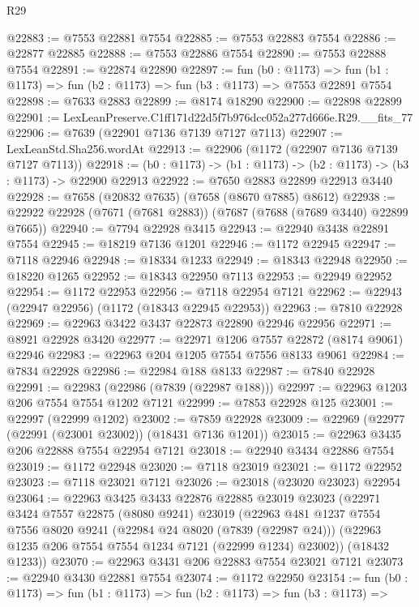 \begin{lexlean}{R29}
\begin{coremodule}
@22883 := @7553 @22881 @7554
@22885 := @7553 @22883 @7554
@22886 := @22877 @22885
@22888 := @7553 @22886 @7554
@22890 := @7553 @22888 @7554
@22891 := @22874 @22890
@22897 := fun (b0 : @1173) =>
  fun (b1 : @1173) => fun (b2 : @1173) => fun (b3 : @1173) => @7553 @22891 @7554
@22898 := @7633 @2883
@22899 := @8174 @18290
@22900 := @22898 @22899
@22901 := LexLeanPreserve.C1ff171d22d5f7b976dcc052a277d666e.R29.__fits_77
@22906 := @7639 (@22901 @7136 @7139 @7127 @7113)
@22907 := LexLeanStd.Sha256.wordAt
@22913 := @22906 (@1172 (@22907 @7136 @7139 @7127 @7113))
@22918 := (b0 : @1173) -> (b1 : @1173) -> (b2 : @1173) -> (b3 : @1173) -> @22900 @22913
@22922 := @7650 @2883 @22899 @22913 @3440
@22928 := @7658 (@20832 @7635) (@7658 (@8670 @7885) @8612)
@22938 := @22922 @22928 (@7671 (@7681 @2883)) (@7687 (@7688 (@7689 @3440) @22899 @7665))
@22940 := @7794 @22928 @3415
@22943 := @22940 @3438 @22891 @7554
@22945 := @18219 @7136 @1201
@22946 := @1172 @22945
@22947 := @7118 @22946
@22948 := @18334 @1233
@22949 := @18343 @22948
@22950 := @18220 @1265
@22952 := @18343 @22950 @7113
@22953 := @22949 @22952
@22954 := @1172 @22953
@22956 := @7118 @22954 @7121
@22962 := @22943 (@22947 @22956) (@1172 (@18343 @22945 @22953))
@22963 := @7810 @22928
@22969 := @22963 @3422 @3437 @22873 @22890 @22946 @22956
@22971 := @8921 @22928 @3420
@22977 := @22971 @1206 @7557 @22872 (@8174 @9061) @22946
@22983 := @22963 @204 @1205 @7554 @7556 @8133 @9061
@22984 := @7834 @22928
@22986 := @22984 @188 @8133
@22987 := @7840 @22928
@22991 := @22983 (@22986 (@7839 (@22987 @188)))
@22997 := @22963 @1203 @206 @7554 @7554 @1202 @7121
@22999 := @7853 @22928 @125
@23001 := @22997 (@22999 @1202)
@23002 := @7859 @22928
@23009 := @22969 (@22977 (@22991 (@23001 @23002)) (@18431 @7136 @1201))
@23015 := @22963 @3435 @206 @22888 @7554 @22954 @7121
@23018 := @22940 @3434 @22886 @7554
@23019 := @1172 @22948
@23020 := @7118 @23019
@23021 := @1172 @22952
@23023 := @7118 @23021 @7121
@23026 := @23018 (@23020 @23023) @22954
@23064 := @22963
    @3425
    @3433
    @22876
    @22885
    @23019
    @23023
    (@22971
      @3424
      @7557
      @22875
      (@8080 @9241)
      @23019
      (@22963
        @481
        @1237
        @7554
        @7556
        @8020
        @9241
        (@22984 @24 @8020 (@7839 (@22987 @24)))
        (@22963 @1235 @206 @7554 @7554 @1234 @7121 (@22999 @1234) @23002))
      (@18432 @1233))
@23070 := @22963 @3431 @206 @22883 @7554 @23021 @7121
@23073 := @22940 @3430 @22881 @7554
@23074 := @1172 @22950
@23154 := fun (b0 : @1173) =>
  fun (b1 : @1173) =>
  fun (b2 : @1173) =>
  fun (b3 : @1173) =>

\end{coremodule}
\end{lexlean}
